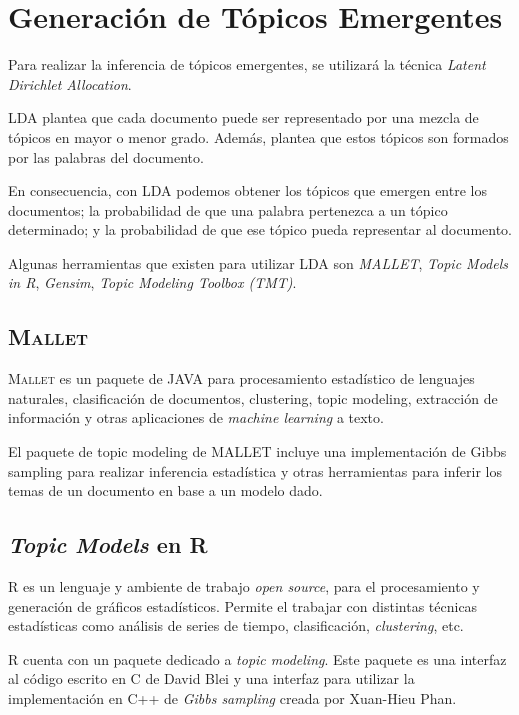 \documentclass[12pt,oneside,letterpaper]{book}
\newcommand{\eng}[1]{\textit{#1}\xspace}			%
\newcommand{\abr}[1]{\textsc{#1}\xspace}           %
\theoremstyle{definition}
\begin{document}
\section{Generación de Tópicos Emergentes}
\label{sec:generacion_de_topicos_emergentes}
Para realizar la inferencia de tópicos emergentes, se utilizará la técnica \eng{Latent Dirichlet Allocation}.

\abr{LDA} plantea que cada documento puede ser representado por una mezcla de tópicos en mayor o menor grado. Además, plantea que estos tópicos son formados por las palabras del documento.

En consecuencia, con \abr{LDA} podemos obtener los tópicos que emergen entre los documentos; la probabilidad de que una palabra pertenezca a un tópico determinado; y la probabilidad de que ese tópico pueda representar al documento.

Algunas herramientas que existen para utilizar \abr{LDA} son \eng{MALLET}, \eng{Topic Models in R}, \eng{Gensim}, \eng{Topic Modeling Toolbox (\abr{TMT})}.

\subsection{\abr{Mallet}}
 \label{sub:mallet}
\abr{Mallet} es un paquete de JAVA para procesamiento estadístico de lenguajes naturales, clasificación de documentos, clustering, topic modeling, extracción de información y otras aplicaciones de \eng{machine learning} a texto.

El paquete de topic modeling de MALLET incluye una implementación de Gibbs sampling para realizar inferencia estadística y otras herramientas para inferir los temas de un documento en base a un modelo dado.

\subsection{\eng{Topic Models} en \abr{R}}
 \label{sub:topic_models_r} 
\abr{R} es un lenguaje y ambiente de trabajo \eng{open source}, para el procesamiento y generación de gráficos estadísticos. Permite el trabajar con distintas técnicas estadísticas como análisis de series de tiempo, clasificación, \eng{clustering}, etc.

\abr{R} cuenta con un paquete dedicado a \eng{topic modeling}. Este paquete es una interfaz al código escrito en \abr{C} de David Blei y una interfaz para utilizar la implementación en \abr{C++} de \eng{Gibbs sampling} creada por Xuan-Hieu Phan.
\end{document}

